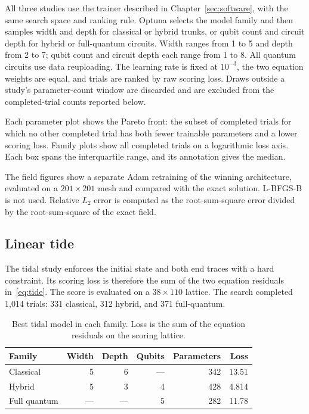 \documentclass{erdc}
\begin{document}
All three studies use the trainer described in Chapter~\ref{sec:software},
with the same search space and ranking rule. Optuna selects the model
family and then samples width and depth for classical or hybrid trunks,
or qubit count and circuit depth for hybrid or full-quantum circuits.
Width ranges from 1 to 5 and depth from 2 to 7; qubit count and circuit
depth each range from 1 to 8. All quantum circuits use data reuploading.
The learning rate is fixed at \(10^{-3}\), the two equation weights are
equal, and trials are ranked by raw scoring loss. Draws outside a
study's parameter-count window are discarded and are excluded from the
completed-trial counts reported below.

Each parameter plot shows the Pareto front: the subset of completed
trials for which no other completed trial has both fewer trainable
parameters and a lower scoring loss. Family plots show all completed
trials on a logarithmic loss axis. Each box spans the interquartile
range, and its annotation gives the median.

The field figures show a separate Adam retraining of the winning
architecture, evaluated on a \(201\times 201\) mesh and compared with
the exact solution. L-BFGS-B is not used. Relative \(L_2\) error is
computed as the root-sum-square error divided by the root-sum-square of
the exact field.

\subsection{Linear tide}
\label{sec:results-tide}

The tidal study enforces the initial state and both end traces with a
hard constraint. Its scoring loss is therefore the sum of the two
equation residuals in~\eqref{eq:tide}. The score is evaluated on a
\(38\times 110\) lattice. The search completed 1{,}014 trials:
331 classical, 312 hybrid, and 371 full-quantum.

\begin{table}[ht]
\centering
\caption{Best tidal model in each family. Loss is the sum of the
equation residuals on the scoring lattice.}
\label{tab:tide-best}
\begin{tabular}{lrrrrr}
\hline
Family & Width & Depth & Qubits & Parameters & Loss \\
\hline
Classical & 5 & 6 & --- & 342 & 13.51 \\
Hybrid & 5 & 3 & 4 & 428 & 4.814 \\
Full quantum & --- & --- & 5 & 282 & 11.78 \\
\hline
\end{tabular}
\end{table}
\end{document}
